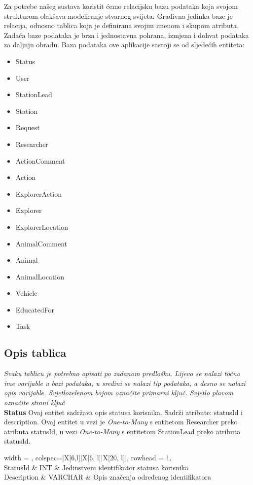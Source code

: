 		Za potrebe našeg sustava koristit ćemo relacijsku bazu podataka koja svojom strukturom olakšava modeliranje stvarnog svijeta. Gradivna jedinka baze je relacija, odnosno tablica koja je definirana svojim imenom i skupom atributa. Zadaća baze podataka je brza i jednostavna pohrana, izmjena i dohvat podataka za daljnju obradu.
		Baza podataka ove aplikacije sastoji se od sljedećih entiteta:
		\begin{itemize}
			\item Status
			\item User
			\item StationLead
			\item Station
			\item Request
			\item Researcher
			\item ActionComment
			\item Action
			\item ExplorerAction
			\item Explorer
			\item ExplorerLocation
			\item AnimalComment
			\item Animal
			\item AnimalLocation
			\item Vehicle
			\item EducatedFor
			\item Task
		\end{itemize}
		
			\subsection{Opis tablica}
			

				\textit{Svaku tablicu je potrebno opisati po zadanom predlošku. Lijevo se nalazi točno ime varijable u bazi podataka, u sredini se nalazi tip podataka, a desno se nalazi opis varijable. Svjetlozelenom bojom označite primarni ključ. Svjetlo plavom označite strani ključ}\\
				
				\textbf{Status} Ovaj entitet sadržava opis statusa korisnika. Sadrži atribute: statusId i description. Ovaj entitet u vezi je \textit{One-to-Many} s entitetom Researcher preko atributa statusId, u vezi \textit{One-to-Many} s entitetom StationLead preko atributa statusId.
				\begin{longtblr}[
					label=none,
					entry=none
					]{
						width = \textwidth,
						colspec={|X[6,l]|X[6, l]|X[20, l]|}, 
						rowhead = 1,
					} %
					\hline {}	 \\ \hline[3pt]
					StatusId & INT	&  	Jedinstveni identifikator statusa korisnika	\\ \hline
					Description	& VARCHAR &   Opis značenja određenog identifikatora	\\ \hline
				\end{longtblr}
				
